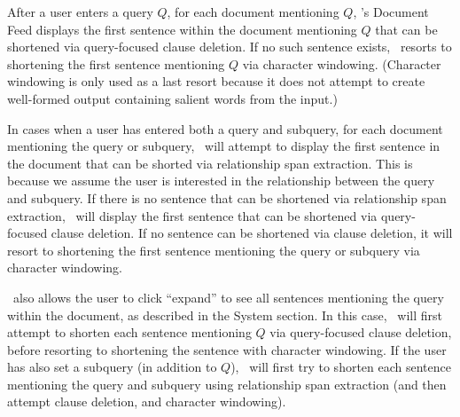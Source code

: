 After a user enters a query $Q$, for each document mentioning $Q$, \ours's Document Feed displays the first sentence within the document mentioning $Q$ that can be shortened via query-focused clause deletion.
If no such sentence exists, \ours~resorts to shortening the first sentence mentioning $Q$ via {character windowing}. 
(Character windowing is only used as a last resort because it does not attempt to create well-formed output containing salient words from the input.)

In cases when a user has entered both a query and subquery, for each document mentioning the query or subquery, \ours~will attempt to display the first sentence in the document that can be shorted via relationship span extraction.
This is because we assume the user is interested in the relationship between the query and subquery.
If there is no sentence that can be shortened via relationship span extraction, \ours~will display the first sentence that can be shortened via query-focused clause deletion.
If no sentence can be shortened via clause deletion, it will resort to shortening the first sentence mentioning the query or subquery via character windowing.


\ours~also allows the user to click ``expand'' to see all sentences mentioning the query within the document, as described in the System section. 
In this case, \ours~will first attempt to shorten each sentence mentioning $Q$ via query-focused clause deletion, before resorting to shortening the sentence with character windowing. 
If the user has also set a subquery (in addition to $Q$), \ours~will first try to shorten each sentence mentioning the query and subquery using relationship span extraction (and then attempt clause deletion, and character windowing).